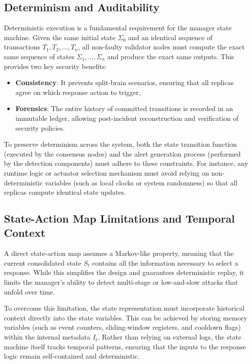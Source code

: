 \subsection{Determinism and Auditability}
\label{subsec:determinism_auditability}

Deterministic execution is a fundamental requirement for the manager state machine. Given the same initial state $\Sigma_0$ and an identical sequence of transactions $T_1, T_2, \dots, T_n$, all non-faulty validator nodes must compute the exact same sequence of states $\Sigma_1, \dots, \Sigma_n$ and produce the exact same outputs. This provides two key security benefits:
\begin{itemize}
    \item \textbf{Consistency}: It prevents split-brain scenarios, ensuring that all replicas agree on which response action to trigger,
    \item \textbf{Forensics}: The entire history of committed transitions is recorded in an immutable ledger, allowing post-incident reconstruction and verification of security policies.
\end{itemize}

To preserve determinism across the system, both the state transition function (executed by the consensus nodes) and the alert generation process (performed by the detection components) must adhere to these constraints. For instance, any runtime logic or actuator selection mechanism must avoid relying on non-deterministic variables (such as local clocks or system randomness) so that all replicas compute identical state updates.

\subsection{State-Action Map Limitations and Temporal Context}
\label{subsec:assumption}

A direct state-action map assumes a Markov-like property, meaning that the current consolidated state $S_t$ contains all the information necessary to select a response. While this simplifies the design and guarantees deterministic replay, it limits the manager's ability to detect multi-stage or low-and-slow attacks that unfold over time. 

To overcome this limitation, the state representation must incorporate historical context directly into the state variables. This can be achieved by storing memory variables (such as event counters, sliding-window registers, and cooldown flags) within the internal metadata $I_t$. Rather than relying on external logs, the state machine itself tracks temporal patterns, ensuring that the inputs to the response logic remain self-contained and deterministic.

